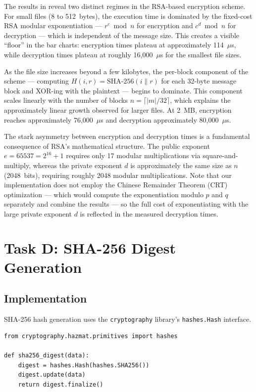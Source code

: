 \documentclass[10pt,a4paper]{article}
\begin{document}
The results in  reveal two distinct regimes in the RSA-based encryption scheme. For small files (8 to 512~bytes), the execution time is dominated by the fixed-cost RSA modular exponentiation --- $r^e \bmod n$ for encryption and $c^d \bmod n$ for decryption --- which is independent of the message size. This creates a visible ``floor'' in the bar charts: encryption times plateau at approximately 114~$\mu$s, while decryption times plateau at roughly 16,000~$\mu$s for the smallest file sizes.

As the file size increases beyond a few kilobytes, the per-block component of the scheme --- computing $H(i, r) = \text{SHA-256}(i \| r)$ for each 32-byte message block and XOR-ing with the plaintext --- begins to dominate. This component scales linearly with the number of blocks $n = \lceil |m| / 32 \rceil$, which explains the approximately linear growth observed for larger files. At 2~MB, encryption reaches approximately 76,000~$\mu$s and decryption approximately 80,000~$\mu$s.

The stark asymmetry between encryption and decryption times is a fundamental consequence
of RSA's mathematical structure. The public exponent $e = 65537 = 2^{16} + 1$ requires only
17 modular multiplications via square-and-multiply, whereas the private exponent $d$ is
approximately the same size as $n$ (2048~bits), requiring roughly 2048 modular multiplications.
Note that our implementation does not employ the Chinese Remainder Theorem (CRT)
optimization --- which would compute the exponentiation modulo $p$ and $q$ separately and
combine the results --- so the full cost of exponentiating with the large private exponent $d$
is reflected in the measured decryption times.

\section{Task D: SHA-256 Digest Generation}
\label{sec:sha}

\subsection{Implementation}

SHA-256 hash generation uses the \texttt{cryptography} library's \texttt{hashes.Hash} interface.

\begin{lstlisting}[caption={SHA-256 digest (see \texttt{src/sha\_hash.py}).}]
from cryptography.hazmat.primitives import hashes

def sha256_digest(data):
    digest = hashes.Hash(hashes.SHA256())
    digest.update(data)
    return digest.finalize()
\end{lstlisting}
\end{document}
